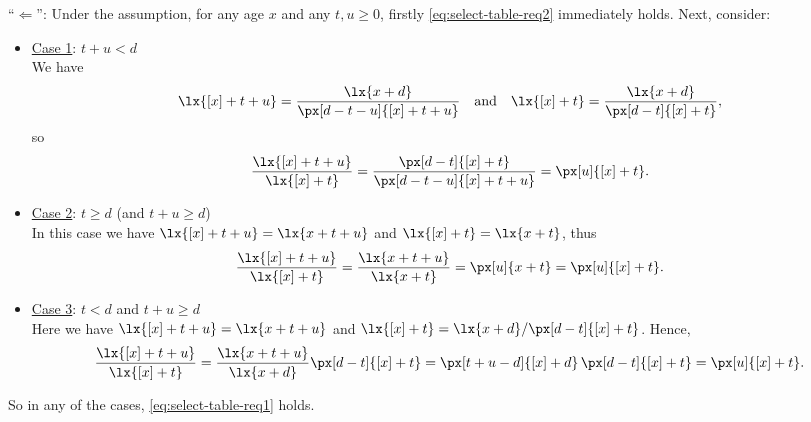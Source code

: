 \begin{enumerate}
\begin{pf}
``\(\Leftarrow\)'': Under the assumption, for any age \(x\) and any \(t,u\ge
0\), firstly \cref{eq:select-table-req2} immediately holds. Next, consider:
\begin{itemize}
\item \underline{Case 1}: \(t+u<d\)\\
We have
\[
\lx{[x]+t+u}=\frac{\lx{x+d}}{\px[d-t-u]{[x]+t+u}}
\quad\text{and}\quad
\lx{[x]+t}=\frac{\lx{x+d}}{\px[d-t]{[x]+t}},
\]
so
\[
\frac{\lx{[x]+t+u}}{\lx{[x]+t}}=\frac{\px[d-t]{[x]+t}}{\px[d-t-u]{[x]+t+u}}
=\px[u]{[x]+t}.
\]
\item \underline{Case 2}: \(t\ge d\) (and \(t+u\ge d\))\\
In this case we have \(\lx{[x]+t+u}=\lx{x+t+u}\) and \(\lx{[x]+t}=\lx{x+t}\),
thus
\[
\frac{\lx{[x]+t+u}}{\lx{[x]+t}}=\frac{\lx{x+t+u}}{\lx{x+t}}=\px[u]{x+t}=\px[u]{[x]+t}.
\]
\item \underline{Case 3}: \(t< d\) and \(t+u\ge d\)\\
Here we have \(\lx{[x]+t+u}=\lx{x+t+u}\) and
\(\lx{[x]+t}=\lx{x+d}/\px[d-t]{[x]+t}\). Hence,
\[
\frac{\lx{[x]+t+u}}{\lx{[x]+t}}
=\frac{\lx{x+t+u}}{\lx{x+d}}\px[d-t]{[x]+t}
=\px[t+u-d]{[x]+d}\,\px[d-t]{[x]+t}
=\px[u]{[x]+t}.
\]
\end{itemize}
So in any of the cases, \cref{eq:select-table-req1} holds.
\end{pf}
\end{enumerate}
